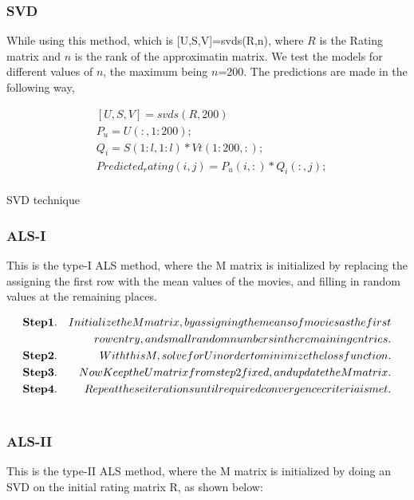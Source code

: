 \subsubsection{SVD}
While using this method, which is [U,S,V]=svds(R,n), where $R$ is the Rating
matrix and $n$ is the rank of the approximatin matrix. We test the models for
different values of $n$, the maximum being $n$=200. The predictions are made in
the following way,

\begingroup
\begin{center}
 

\begin{align*}
 & [U,S,V] = svds(R,200) \\
 & P_u = U(:,1:200); \\
 & Q_i=S(1:l,1:l)*Vt(1:200,:); \\
 & Predicted_rating(i,j)=P_u(i,:)*Q_i(:,j); \\
\end{align*}
\caption{SVD technique}
\end{center}

\endgroup

\subsubsection{ALS-I}
This is the type-I ALS method, where the M matrix is initialized by replacing
the assigning the first row with the mean values of the movies, and filling in
random values at the remaining places. 

\begin{align*}
 & \bold{Step 1.} & Initialize the M matrix, by assigning the means of movies as
the first\\
 &                & row entry, and small random numbers in the remaining
entries. \\
 & \bold{Step 2.} & With this M, solve for U in order to minimize the loss
function.\\
 & \bold{Step 3.} & Now Keep the U matrix from step 2 fixed, and update the M
matrix.\\
 & \bold{Step 4.} & Repeat these iterations until required convergence criteria
is met.\\
\end{align*}

\subsubsection{ALS-II}
This is the type-II ALS method, where the M matrix is initialized by doing an
SVD on the initial rating matrix R, as shown below:

